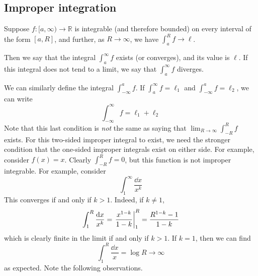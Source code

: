 \subsection{Improper integration}
\begin{definition}
	Suppose \(f \colon [a, \infty) \to \mathbb R\) is integrable (and therefore bounded) on every interval of the form \([a, R]\), and further, as \(R \to \infty\), we have \(\int_a^R f \to \ell\).

	Then we say that the integral \(\int_a^\infty f\) exists (or converges), and its value is \(\ell\).
	If this integral does not tend to a limit, we say that \(\int_a^\infty f\) diverges.
\end{definition}
We can similarly define the integral \(\int_{-\infty}^a f\).
If \(\int_a^\infty f = \ell_1\) and \(\int_{-\infty}^a f = \ell_2\), we can write
\[
	\int_{-\infty}^\infty f = \ell_1 + \ell_2
\]
Note that this last condition is \textit{not} the same as saying that \(\lim_{R \to \infty}\int_{-R}^R f\) exists.
For this two-sided improper integral to exist, we need the stronger condition that the one-sided improper integrals exist on either side.
For example, consider \(f(x) = x\).
Clearly \(\int_{-R}^R f = 0\), but this function is not improper integrable.
For example, consider
\[
	\int_1^\infty \frac{\dd{x}}{x^k}
\]
This converges if and only if \(k > 1\).
Indeed, if \(k \neq 1\),
\[
	\int_1^R \frac{\dd{x}}{x^k} = \eval{\frac{x^{1-k}}{1-k}}_1^R = \frac{R^{1-k} - 1}{1-k}
\]
which is clearly finite in the limit if and only if \(k > 1\).
If \(k=1\), then we can find
\[
	\int_1^R \frac{\dd{x}}{x} = \log R \to \infty
\]
as expected.
Note the following observations.
